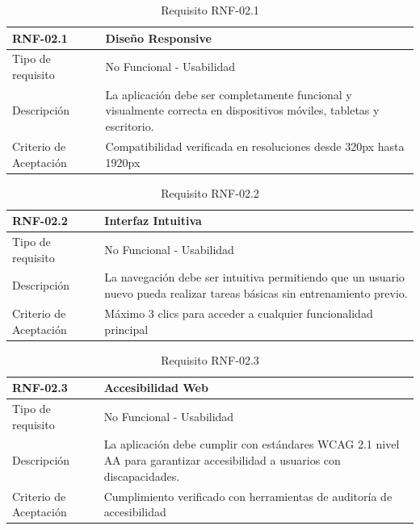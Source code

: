 
\begin{table}[H]
\centering
\begin{tabular}{|p{3cm}|p{10cm}|}
\hline
\rowcolor{tealblue}
{\textbf{RNF-02.1}} & {\textbf{Diseño Responsive}} \\
\hline
Tipo de requisito & No Funcional - Usabilidad \\
\hline
Descripción & La aplicación debe ser completamente funcional y visualmente correcta en dispositivos móviles, tabletas y escritorio. \\
\hline
Criterio de Aceptación & Compatibilidad verificada en resoluciones desde 320px hasta 1920px \\
\hline
\end{tabular}
\caption{Requisito RNF-02.1}
\end{table}

\begin{table}[H]
\centering
\begin{tabular}{|p{3cm}|p{10cm}|}
\hline
\rowcolor{tealblue}
{\textbf{RNF-02.2}} & {\textbf{Interfaz Intuitiva}} \\
\hline
Tipo de requisito & No Funcional - Usabilidad \\
\hline
Descripción & La navegación debe ser intuitiva permitiendo que un usuario nuevo pueda realizar tareas básicas sin entrenamiento previo. \\
\hline
Criterio de Aceptación & Máximo 3 clics para acceder a cualquier funcionalidad principal \\
\hline
\end{tabular}
\caption{Requisito RNF-02.2}
\end{table}

\begin{table}[H]
\centering
\begin{tabular}{|p{3cm}|p{10cm}|}
\hline
\rowcolor{tealblue}
{\textbf{RNF-02.3}} & {\textbf{Accesibilidad Web}} \\
\hline
Tipo de requisito & No Funcional - Usabilidad \\
\hline
Descripción & La aplicación debe cumplir con estándares WCAG 2.1 nivel AA para garantizar accesibilidad a usuarios con discapacidades. \\
\hline
Criterio de Aceptación & Cumplimiento verificado con herramientas de auditoría de accesibilidad \\
\hline
\end{tabular}
\caption{Requisito RNF-02.3}
\end{table}

